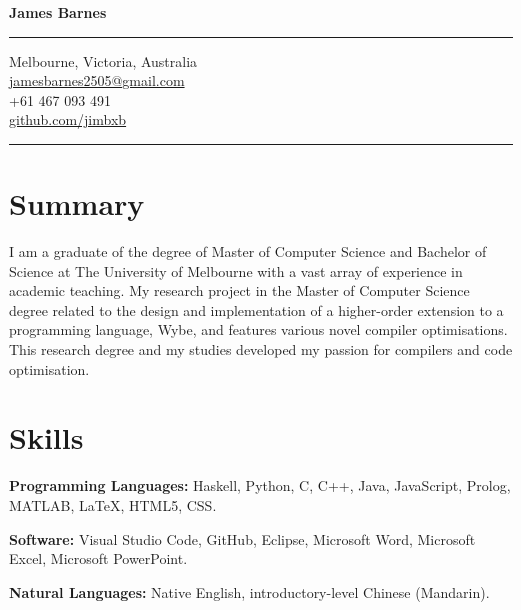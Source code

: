 \documentclass[9pt]{extarticle}
\newcommand{\skills}[2]{
    \textbf{#1} \newline
    #2
}
\begin{document}
\pagestyle{empty} 

\begin{minipage}[t]{.30\textwidth}
\vspace*{0pt}

\begin{center}
{\huge \bfseries James Barnes\par}
\end{center}

\bigskip
\hrule
\bigskip

\begin{center}
Melbourne, Victoria, Australia \\
\href{mailto:jamesbarnes2505@gmail.com}{jamesbarnes2505@gmail.com} \\
+61 467 093 491 \\
\href{http://github.com/jimbxb}{github.com/jimbxb}
\end{center}

\bigskip
\hrule
\bigskip

\section{Summary}

\begin{flushleft}
I am a graduate of the degree of Master of Computer Science and Bachelor of Science at 
The University of Melbourne with a vast array of experience in academic teaching. 
My research project in the Master of Computer Science degree related to the design and implementation 
of a higher-order extension to a programming language, Wybe, and features various novel compiler optimisations.
This research degree and my studies developed my passion for compilers and code optimisation.
\end{flushleft} 

\medskip

\section{Skills}

\skills{Programming Languages:}
{Haskell, Python, C, C++, Java, JavaScript, Prolog, MATLAB, {\fontfamily{cmr}\selectfont \LaTeX{}}, HTML5, CSS. \newline }

\skills{Software:}
{Visual Studio Code, GitHub, Eclipse, Microsoft Word, Microsoft Excel, Microsoft PowerPoint. \newline }

\skills{Natural Languages:}
{Native English, introductory-level Chinese (Mandarin).}


\end{minipage}
\end{document}
